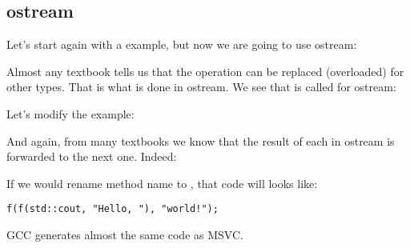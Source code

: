 \subsection{ostream}

Let's start again with a  example, but now we are going to use ostream:



Almost any \Cpp textbook tells us that the \TT{<<} operation can be replaced (overloaded) for other types.
That is what is done in ostream.
We see that  is called for ostream:



Let's modify the example:



And again, from many \Cpp textbooks we know that the result of each  in ostream is forwarded to the
next one.
Indeed:



If we would rename  method name to \ttf{}, that code will looks like:

\begin{lstlisting}
f(f(std::cout, "Hello, "), "world!");
\end{lstlisting}

GCC generates almost the same code as MSVC.


